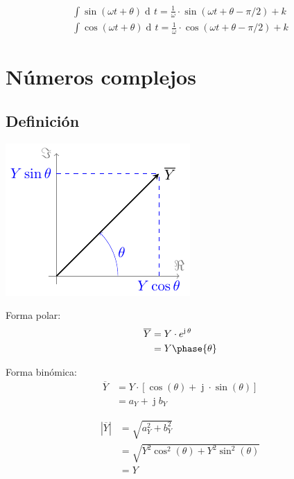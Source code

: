 \documentclass[article, a4paper]{memoir}
\DeclareMathOperator{\di}{d\!}
\DeclareMathOperator{\ji}{\mathrm{j}}
\begin{document}
\vspace{-4mm}
\begin{align*}
  \int \sin(\omega t + \theta) \di t = \frac{1}{\omega} \cdot \sin(\omega t + \theta - \pi/2) + k\\
  \int \cos(\omega t + \theta) \di t = \frac{1}{\omega} \cdot \cos(\omega t + \theta - \pi/2) + k
\end{align*}


\section{Números complejos}

\subsection{Definición}

\begin{minipage}{0.26\linewidth}
  \hspace{-6mm}\includegraphics{../figs/fasor}  
\end{minipage}
\begin{minipage}{0.74\linewidth}
    \begin{minipage}{0.24\linewidth}
      Forma polar:
      \begin{align*}
        \overline{Y} &= Y\cdot e^{\ji\theta}\\
                         &= Y\phase{\theta}
      \end{align*}  
    \end{minipage}
    \begin{minipage}{0.29\linewidth}
      Forma binómica:
      \begin{align*}
        \overline{Y} &= Y \cdot [ \cos(\theta)+\ji\cdot\sin(\theta) ]\\
                     &= a_Y + \ji b_Y
      \end{align*}  
    \end{minipage}
    \begin{minipage}{0.5\linewidth}
        \begin{align*}
          |\overline{Y}| &= \sqrt{a^2_Y + b^2_Y} \\
              &=\sqrt{Y^2\cos^2(\theta) + Y^2\sin^2(\theta)}\\
              &= Y
        \end{align*}  
    \end{minipage}  
\end{minipage}
\end{document}
